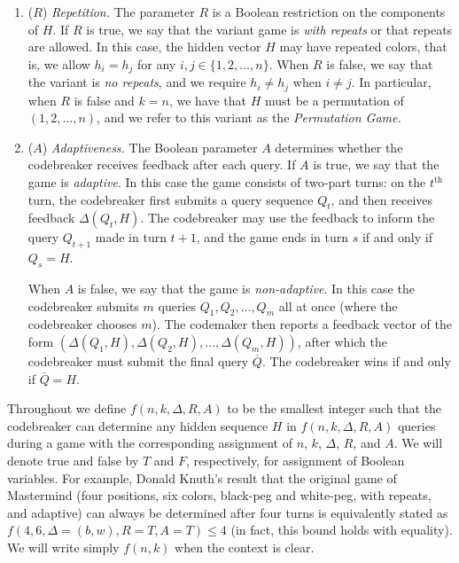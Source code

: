 \documentclass[12pt, a4paper]{article}
\newcommand{\nth}{^{\text{th}}}       %
\begin{document}
\begin{enumerate}[label=(\roman*)]
	\item($R$) \textit{Repetition.} The parameter $R$ is a Boolean restriction on the components of $H$. If $R$ is true, we say that the variant game is \textit{with repeats} or that repeats are allowed. In this case, the hidden vector $H$ may have repeated colors, that is, we allow $h_i = h_j$ for any $i,j\in\{1,2,\ldots, n\}$. When $R$ is false, we say that the variant is \textit{no repeats}, and we require $h_i\neq h_j$ when $i\neq j$. In particular, when $R$ is false and $k = n$, we have that $H$ must be a permutation of $(1, 2, \ldots, n)$, and we refer to this variant as the \textit{Permutation Game.}
	
	\item($A$) \textit{Adaptiveness.} The Boolean parameter $A$ determines whether the codebreaker receives feedback after each query. If $A$ is true, we say that the game is \textit{adaptive}. In this case the game consists of two-part turns: on the $t\nth$ turn, the codebreaker first submits a query sequence $Q_t$, and then receives feedback $\Delta(Q_t, H)$. The codebreaker may use the feedback to inform the query $Q_{t+1}$ made in turn $t+1$, and the game ends in turn $s$ if and only if $Q_s = H$.
	
	When $A$ is false, we say that the game is \textit{non-adaptive}. In this case the codebreaker submits $m$ queries $Q_1, Q_2, \ldots, Q_m$ all at once (where the codebreaker chooses $m$). The codemaker then reports a feedback vector of the form $(\Delta(Q_1, H), \Delta(Q_2, H), \ldots, \Delta(Q_m, H))$, after which the codebreaker must submit the final query $\overline{Q}$. The codebreaker wins if and only if $\overline{Q} = H$.
\end{enumerate}

Throughout we define $f(n, k, \Delta, R, A)$ to be the smallest integer such that the codebreaker can determine any hidden sequence $H$ in $f(n, k, \Delta, R, A)$ queries during a game with the corresponding assignment of $n$, $k$, $\Delta$, $R$, and $A$. We will denote true and false by $T$ and $F$, respectively, for assignment of Boolean variables. For example, Donald Knuth's result that the original game of Mastermind (four positions, six colors, black-peg and white-peg, with repeats, and adaptive) can always be determined after four turns is equivalently stated as $f(4, 6, \Delta = (b,w), R=T, A=T)\le 4$ (in fact, this bound holds with equality). We will write simply $f(n, k)$ when the context is clear.
\end{document}
